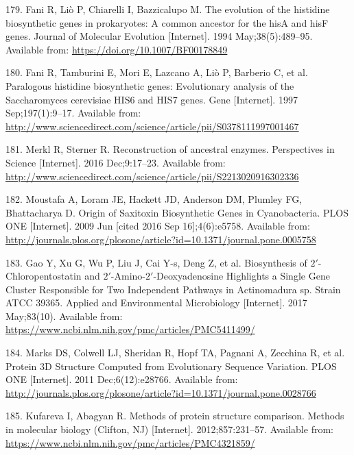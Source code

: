 \documentclass[12pt,twoside]{reedthesis}
\begin{document}
  \hypertarget{ref-fani_evolution_1994}{}
  179. Fani R, Liò P, Chiarelli I, Bazzicalupo M. The evolution of the
  histidine biosynthetic genes in prokaryotes: A common ancestor for the
  hisA and hisF genes. Journal of Molecular Evolution {[}Internet{]}. 1994
  May;38(5):489--95. Available from:
  \url{https://doi.org/10.1007/BF00178849}
  
  \hypertarget{ref-fani_paralogous_1997}{}
  180. Fani R, Tamburini E, Mori E, Lazcano A, Liò P, Barberio C, et al.
  Paralogous histidine biosynthetic genes: Evolutionary analysis of the
  Saccharomyces cerevisiae HIS6 and HIS7 genes. Gene {[}Internet{]}. 1997
  Sep;197(1):9--17. Available from:
  \url{http://www.sciencedirect.com/science/article/pii/S0378111997001467}
  
  \hypertarget{ref-merkl_reconstruction_2016}{}
  181. Merkl R, Sterner R. Reconstruction of ancestral enzymes.
  Perspectives in Science {[}Internet{]}. 2016 Dec;9:17--23. Available
  from:
  \url{http://www.sciencedirect.com/science/article/pii/S2213020916302336}
  
  \hypertarget{ref-moustafa_origin_2009}{}
  182. Moustafa A, Loram JE, Hackett JD, Anderson DM, Plumley FG,
  Bhattacharya D. Origin of Saxitoxin Biosynthetic Genes in Cyanobacteria.
  PLOS ONE {[}Internet{]}. 2009 Jun {[}cited 2016 Sep 16{]};4(6):e5758.
  Available from:
  \url{http://journals.plos.org/plosone/article?id=10.1371/journal.pone.0005758}
  
  \hypertarget{ref-gao_biosynthesis_2017}{}
  183. Gao Y, Xu G, Wu P, Liu J, Cai Y-s, Deng Z, et al. Biosynthesis of
  \(2\prime\)-Chloropentostatin and
  \(2\prime\)-Amino-\(2\prime\)-Deoxyadenosine Highlights a Single Gene
  Cluster Responsible for Two Independent Pathways in Actinomadura sp.
  Strain ATCC 39365. Applied and Environmental Microbiology
  {[}Internet{]}. 2017 May;83(10). Available from:
  \url{https://www.ncbi.nlm.nih.gov/pmc/articles/PMC5411499/}
  
  \hypertarget{ref-marks_protein_2011}{}
  184. Marks DS, Colwell LJ, Sheridan R, Hopf TA, Pagnani A, Zecchina R,
  et al. Protein 3D Structure Computed from Evolutionary Sequence
  Variation. PLOS ONE {[}Internet{]}. 2011 Dec;6(12):e28766. Available
  from:
  \url{http://journals.plos.org/plosone/article?id=10.1371/journal.pone.0028766}
  
  \hypertarget{ref-kufareva_methods_2012}{}
  185. Kufareva I, Abagyan R. Methods of protein structure comparison.
  Methods in molecular biology (Clifton, NJ) {[}Internet{]}.
  2012;857:231--57. Available from:
  \url{https://www.ncbi.nlm.nih.gov/pmc/articles/PMC4321859/}
  
\end{document}
